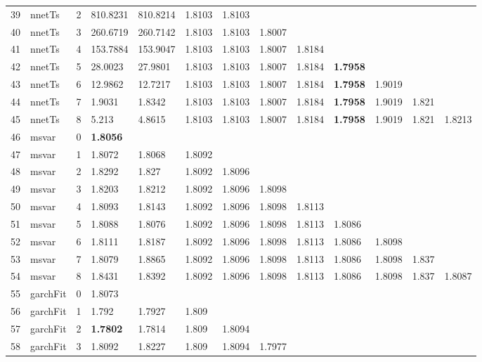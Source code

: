 \documentclass[10pt,a4paper]{article}
\begin{document}
\begin{table}[ht]
\begin{tabular}{rlrllllllllll}
  39 & nnetTs &     2 & 810.8231 & 810.8214 & 1.8103 & 1.8103 &  &  &  &  &  &  \\ 
  40 & nnetTs &     3 & 260.6719 & 260.7142 & 1.8103 & 1.8103 & 1.8007 &  &  &  &  &  \\ 
  41 & nnetTs &     4 & 153.7884 & 153.9047 & 1.8103 & 1.8103 & 1.8007 & 1.8184 &  &  &  &  \\ 
  42 & nnetTs &     5 & 28.0023 & 27.9801 & 1.8103 & 1.8103 & 1.8007 & 1.8184 & \textbf{1.7958} &  &  &  \\ 
  43 & nnetTs &     6 & 12.9862 & 12.7217 & 1.8103 & 1.8103 & 1.8007 & 1.8184 & \textbf{1.7958} & 1.9019 &  &  \\ 
  44 & nnetTs &     7 & 1.9031 & 1.8342 & 1.8103 & 1.8103 & 1.8007 & 1.8184 & \textbf{1.7958} & 1.9019 & 1.821 &  \\ 
  45 & nnetTs &     8 & 5.213 & 4.8615 & 1.8103 & 1.8103 & 1.8007 & 1.8184 & \textbf{1.7958} & 1.9019 & 1.821 & 1.8213 \\ 
   \hline
46 & msvar &     0 & \textbf{1.8056} &  &  &  &  &  &  &  &  &  \\ 
  47 & msvar &     1 & 1.8072 & 1.8068 & 1.8092 &  &  &  &  &  &  &  \\ 
  48 & msvar &     2 & 1.8292 & 1.827 & 1.8092 & 1.8096 &  &  &  &  &  &  \\ 
  49 & msvar &     3 & 1.8203 & 1.8212 & 1.8092 & 1.8096 & 1.8098 &  &  &  &  &  \\ 
  50 & msvar &     4 & 1.8093 & 1.8143 & 1.8092 & 1.8096 & 1.8098 & 1.8113 &  &  &  &  \\ 
  51 & msvar &     5 & 1.8088 & 1.8076 & 1.8092 & 1.8096 & 1.8098 & 1.8113 & 1.8086 &  &  &  \\ 
  52 & msvar &     6 & 1.8111 & 1.8187 & 1.8092 & 1.8096 & 1.8098 & 1.8113 & 1.8086 & 1.8098 &  &  \\ 
  53 & msvar &     7 & 1.8079 & 1.8865 & 1.8092 & 1.8096 & 1.8098 & 1.8113 & 1.8086 & 1.8098 & 1.837 &  \\ 
  54 & msvar &     8 & 1.8431 & 1.8392 & 1.8092 & 1.8096 & 1.8098 & 1.8113 & 1.8086 & 1.8098 & 1.837 & 1.8087 \\ 
   \hline
55 & garchFit &     0 & 1.8073 &  &  &  &  &  &  &  &  &  \\ 
  56 & garchFit &     1 & 1.792 & 1.7927 & 1.809 &  &  &  &  &  &  &  \\ 
  57 & garchFit &     2 & \textbf{1.7802} & 1.7814 & 1.809 & 1.8094 &  &  &  &  &  &  \\ 
  58 & garchFit &     3 & 1.8092 & 1.8227 & 1.809 & 1.8094 & 1.7977 &  &  &  &  &  \\ 

\end{tabular}
\end{table}
\end{document}

